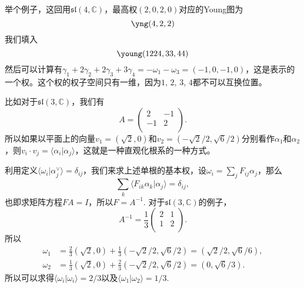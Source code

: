 \documentclass[9pt]{extarticle}
\newcommand{\cc}{\mathbb{C}}
\begin{document}
举个例子，这回用$\mathfrak{sl}(4,\cc)$，最高权$(2,0,2,0)$对应的Young图为
\[
	\yng(4,2,2)
\]
我们填入
\[
	\young(1224,33,44)
\]
然后可以计算有$\gamma_1+2\gamma_2+2\gamma_3+3\gamma_4=-\omega_1-\omega_3=(-1,0,-1,0)$，这是表示的一个权。这个权的权子空间只有一维，因为$1$, $2$, $3$, $4$都不可以互换位置。


\para 比如对于$\mathfrak{sl}(3,\cc)$，我们有
\[
	A=\begin{pmatrix}
	2&-1\\
	-1&2\\
	\end{pmatrix}.
\]
所以如果以平面上的向量$v_1=(\sqrt{2},0)$和$v_2=(-\sqrt{2}/2,\sqrt{6}/2)$分别看作$\alpha_1$和$\alpha_2$，则$v_i\cdot v_j=\langle \alpha_i|\alpha_j\rangle$，这就是一种直观化根系的一种方式。

利用定义$\langle \omega_i|\alpha_j^\vee\rangle=\delta_{ij}$，我们来求上述单根的基本权，设$\omega_i=\sum_j F_{ij} \alpha_j$，那么
\[
	\sum_k\langle F_{ik} \alpha_k|\alpha_j\rangle=\delta_{ij},
\]
也即求矩阵方程$FA=I$，所以$F=A^{-1}$. 对于$\mathfrak{sl}(3,\cc)$的例子，
\[
	A^{-1}=\frac{1}{3}\begin{pmatrix}
	2&1\\
	1&2\\
	\end{pmatrix}.
\]
所以
\begin{align*}
\omega_1&=\frac{2}{3}(\sqrt{2},0)+\frac{1}{3}(-\sqrt{2}/2,\sqrt{6}/2)=(\sqrt{2}/2,\sqrt{6}/6),\\
\omega_2&=\frac{1}{3}(\sqrt{2},0)+\frac{2}{3}(-\sqrt{2}/2,\sqrt{6}/2)=(0,\sqrt{6}/3).
\end{align*}
所以可以求得$\langle \omega_i|\omega_i\rangle=2/3$以及$\langle \omega_1|\omega_2\rangle=1/3$. 
\end{document}
